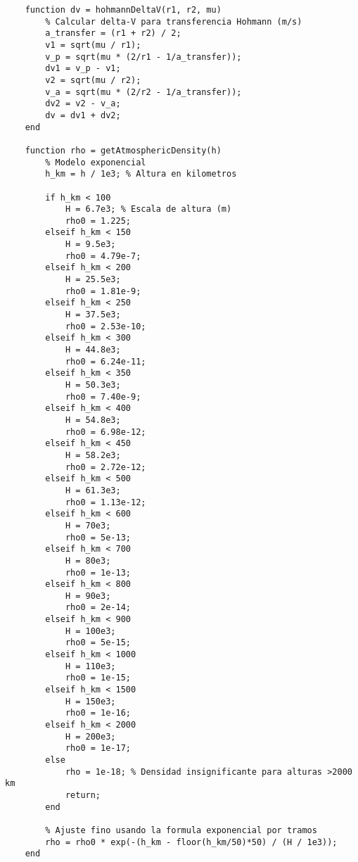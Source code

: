 \begin{verbatim}
    function dv = hohmannDeltaV(r1, r2, mu)
        % Calcular delta-V para transferencia Hohmann (m/s)
        a_transfer = (r1 + r2) / 2;
        v1 = sqrt(mu / r1);
        v_p = sqrt(mu * (2/r1 - 1/a_transfer));
        dv1 = v_p - v1;
        v2 = sqrt(mu / r2);
        v_a = sqrt(mu * (2/r2 - 1/a_transfer));
        dv2 = v2 - v_a;
        dv = dv1 + dv2;
    end
    
    function rho = getAtmosphericDensity(h)
        % Modelo exponencial
        h_km = h / 1e3; % Altura en kilometros
        
        if h_km < 100
            H = 6.7e3; % Escala de altura (m)
            rho0 = 1.225;
        elseif h_km < 150
            H = 9.5e3;
            rho0 = 4.79e-7;
        elseif h_km < 200
            H = 25.5e3;
            rho0 = 1.81e-9;
        elseif h_km < 250
            H = 37.5e3;
            rho0 = 2.53e-10;
        elseif h_km < 300
            H = 44.8e3;
            rho0 = 6.24e-11;
        elseif h_km < 350
            H = 50.3e3;
            rho0 = 7.40e-9;
        elseif h_km < 400
            H = 54.8e3;
            rho0 = 6.98e-12;
        elseif h_km < 450
            H = 58.2e3;
            rho0 = 2.72e-12;
        elseif h_km < 500
            H = 61.3e3;
            rho0 = 1.13e-12;
        elseif h_km < 600
            H = 70e3;
            rho0 = 5e-13;
        elseif h_km < 700
            H = 80e3;
            rho0 = 1e-13;
        elseif h_km < 800
            H = 90e3;
            rho0 = 2e-14;
        elseif h_km < 900
            H = 100e3;
            rho0 = 5e-15;
        elseif h_km < 1000
            H = 110e3;
            rho0 = 1e-15;
        elseif h_km < 1500
            H = 150e3;
            rho0 = 1e-16;
        elseif h_km < 2000
            H = 200e3;
            rho0 = 1e-17;
        else
            rho = 1e-18; % Densidad insignificante para alturas >2000 km
            return;
        end
        
        % Ajuste fino usando la formula exponencial por tramos
        rho = rho0 * exp(-(h_km - floor(h_km/50)*50) / (H / 1e3));
    end

\end{verbatim}